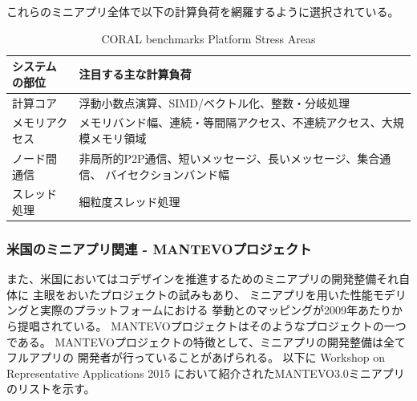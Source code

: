 これらのミニアプリ全体で以下の計算負荷を網羅するように選択されている。

\begin{table}[H]
\caption{CORAL benchmarks Platform Stress Areas}
\label{tab:CORAL-benchmarks-stress}
{
\begin{tabular}{p{30mm}|p{120mm}} \hline
システムの部位	&	注目する主な計算負荷 \\ \hline \hline

計算コア
	& 浮動小数点演算、SIMD/ベクトル化、整数・分岐処理 \\
	\hline
メモリアクセス
	& メモリバンド幅、連続・等間隔アクセス、不連続アクセス、大規模メモリ領域\\
	\hline
ノード間通信
	& 非局所的P2P通信、短いメッセージ、長いメッセージ、集合通信、
		バイセクションバンド幅　\\
	\hline
スレッド処理
	& 細粒度スレッド処理　\\
	\hline
\end{tabular}
}
\end{table}


\subsubsection{米国のミニアプリ関連 - MANTEVOプロジェクト}
また、米国においてはコデザインを推進するためのミニアプリの開発整備それ自体に
主眼をおいたプロジェクトの試みもあり、
ミニアプリを用いた性能モデリングと実際のプラットフォームにおける
挙動とのマッピングが2009年あたりから提唱されている。
MANTEVOプロジェクトはそのようなプロジェクトの一つである。\cite{MANTEVO-project}
MANTEVOプロジェクトの特徴として、ミニアプリの開発整備は全てフルアプリの
開発者が行っていることがあげられる。
以下に Workshop on Representative Applications 2015 \cite{MANTEVO-Reps}
において紹介されたMANTEVO3.0ミニアプリのリストを示す。


